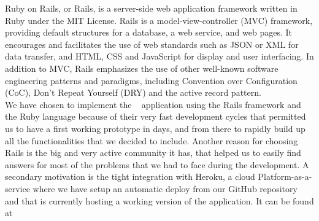 Ruby on Rails, or Rails, is a server-side web application framework written in Ruby under the MIT License. Rails is a model-view-controller (MVC) framework, providing default structures for a database, a web service, and web pages. It encourages and facilitates the use of web standards such as JSON or XML for data transfer, and HTML, CSS and JavaScript for display and user interfacing. In addition to MVC, Rails emphasizes the use of other well-known software engineering patterns and paradigms, including Convention over Configuration (CoC), Don't Repeat Yourself (DRY) and the active record pattern.\\
We have chosen to implement the \projectname~ application using the Rails framework and the Ruby language because of their very fast development cycles that permitted us to have a first working prototype in days, and from there to rapidly build up all the functionalities that we decided to include. Another reason for choosing Rails is the big and very active community it has, that helped us to easily find answers for most of the problems that we had to face during the development. A secondary motivation is the tight integration with Heroku, a cloud Platform-as-a-service where we have setup an automatic deploy from our GitHub repository and that is currently hosting a working version of the application. It can be found at \href{\herokuLink}{\herokuLink}